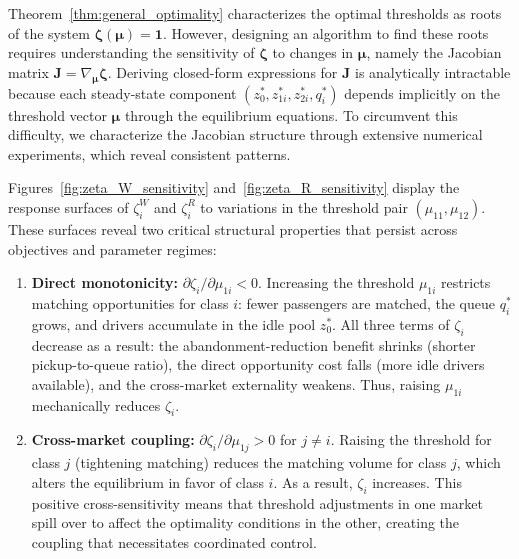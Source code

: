 Theorem~\ref{thm:general_optimality} characterizes the optimal thresholds as roots of the system $\boldsymbol{\zeta}(\boldsymbol{\mu}) = \mathbf{1}$.
However, designing an algorithm to find these roots requires understanding the sensitivity of $\boldsymbol{\zeta}$ to changes in $\boldsymbol{\mu}$, namely the Jacobian matrix $\mathbf{J} = \nabla_{\boldsymbol{\mu}} \boldsymbol{\zeta}$.
Deriving closed-form expressions for $\mathbf{J}$ is analytically intractable because each steady-state component $(z_0^*, z_{1i}^*, z_{2i}^*, q_i^*)$ depends implicitly on the threshold vector $\boldsymbol{\mu}$ through the equilibrium equations.
To circumvent this difficulty, we characterize the Jacobian structure through extensive numerical experiments, which reveal consistent patterns.

Figures~\ref{fig:zeta_W_sensitivity} and~\ref{fig:zeta_R_sensitivity} display the response surfaces of $\zeta_i^W$ and $\zeta_i^R$ to variations in the threshold pair $(\mu_{11}, \mu_{12})$.
These surfaces reveal two critical structural properties that persist across objectives and parameter regimes:

\begin{enumerate}
\item \textbf{Direct monotonicity:} 
$\partial \zeta_i / \partial \mu_{1i} < 0$.
Increasing the threshold $\mu_{1i}$ restricts matching opportunities for class $i$: fewer passengers are matched, the queue $q_i^*$ grows, and drivers accumulate in the idle pool $z_0^*$.
All three terms of $\zeta_i$ decrease as a result: the abandonment-reduction benefit shrinks (shorter pickup-to-queue ratio), the direct opportunity cost falls (more idle drivers available), and the cross-market externality weakens.
Thus, raising $\mu_{1i}$ mechanically reduces $\zeta_i$.

\item \textbf{Cross-market coupling:} 
$\partial \zeta_i / \partial \mu_{1j} > 0$ for $j \neq i$.
Raising the threshold for class $j$ (tightening matching) reduces the matching volume for class $j$, which alters the equilibrium in favor of class $i$.
As a result, $\zeta_i$ increases.
This positive cross-sensitivity means that threshold adjustments in one market spill over to affect the optimality conditions in the other, creating the coupling that necessitates coordinated control.
\end{enumerate}


